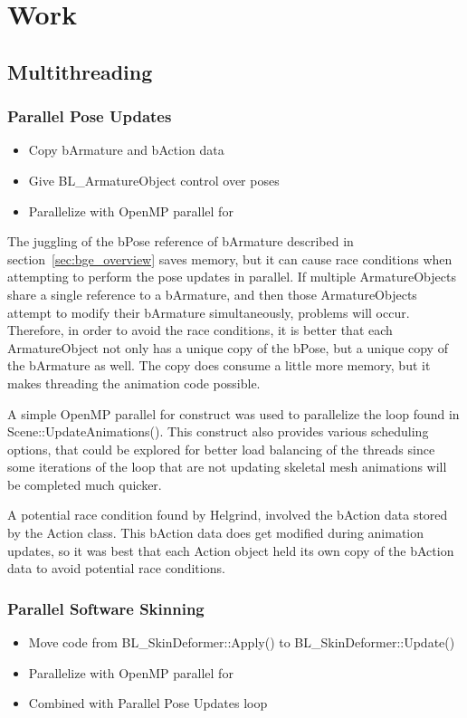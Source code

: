 \section{Work}
\subsection{Multithreading}
\subsubsection{Parallel Pose Updates}
\ifsummaries
\begin{itemize}
 \item Copy bArmature and bAction data
 \item Give BL\_ArmatureObject control over poses
 \item Parallelize with OpenMP parallel for
\end{itemize}
\fi

The juggling of the bPose reference of bArmature described in section~\ref{sec:bge_overview} saves memory, but it can cause race conditions when attempting to perform the pose updates in parallel.
If multiple ArmatureObjects share a single reference to a bArmature, and then those ArmatureObjects attempt to modify their bArmature simultaneously, problems will occur.
Therefore, in order to avoid the race conditions, it is better that each ArmatureObject not only has a unique copy of the bPose, but a unique copy of the bArmature as well.
The copy does consume a little more memory, but it makes threading the animation code possible.

A simple OpenMP parallel for construct was used to parallelize the loop found in Scene::UpdateAnimations().
This construct also provides various scheduling options, that could be explored for better load balancing of the threads since some iterations of the loop that are not updating skeletal mesh animations will be completed much quicker.

A potential race condition found by Helgrind, involved the bAction data stored by the Action class.
This bAction data does get modified during animation updates, so it was best that each Action object held its own copy of the bAction data to avoid potential race conditions.



\subsubsection{Parallel Software Skinning}
\ifsummaries
\begin{itemize}
 \item Move code from BL\_SkinDeformer::Apply() to BL\_SkinDeformer::Update()
 \item Parallelize with OpenMP parallel for
 \item Combined with Parallel Pose Updates loop
\end{itemize}
\fi


